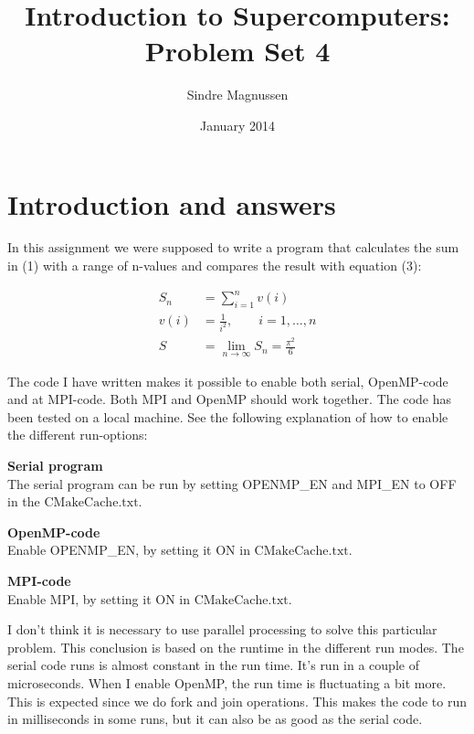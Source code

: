\documentclass{article}
\title{Introduction to Supercomputers: Problem Set 4}
\author{Sindre Magnussen}
\date{January 2014}
\begin{document}
\maketitle

\section*{Introduction and answers}
	In this assignment we were supposed to write a program that calculates the sum in (1) with a range of n-values and compares the result with equation (3):
	
	\begin{align}
	S_n &= \sum_{i = 1}^{n} v(i) \\
	v(i) &= \frac{1}{i^2},\qquad i = 1,\ldots,n \\
	S &= \lim_{n\to\infty} S_n = \frac{\pi^2}{6}
	\end{align}
	
	The code I have written makes it possible to enable both serial, OpenMP-code and at MPI-code. Both MPI and OpenMP should work together. The code has been tested on a local machine. See the following explanation of how to enable the different run-options: 

\begin{list}{}{}
\item \textbf{Serial program} \\
	The serial program can be run by setting OPENMP\_EN and MPI\_EN to OFF in the $\mathrm{CMakeCache.txt}$.
	
\item \textbf{OpenMP-code} \\
	Enable OPENMP\_EN, by setting it ON in $\mathrm{CMakeCache.txt}$. 
	
\item \textbf{MPI-code} \\
	Enable MPI, by setting it ON in $\mathrm{CMakeCache.txt}$. 
\end{list}

I don't think it is necessary to use parallel processing to solve this particular problem. This conclusion is based on the runtime in the different run modes. The serial code runs is almost constant in the run time. It's run in a couple of microseconds. When I enable OpenMP, the run time is fluctuating a bit more. This is expected since we do fork and join operations. This makes the code to run in milliseconds in some runs, but it can also be as good as the serial code.  
\end{document}

